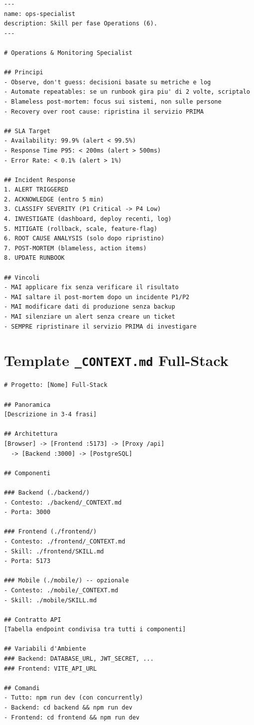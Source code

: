 \begin{lstlisting}[language={},title={SKILL.md --- Operations \& Monitoring Specialist}]
---
name: ops-specialist
description: Skill per fase Operations (6).
---

# Operations & Monitoring Specialist

## Principi
- Observe, don't guess: decisioni basate su metriche e log
- Automate repeatables: se un runbook gira piu' di 2 volte, scriptalo
- Blameless post-mortem: focus sui sistemi, non sulle persone
- Recovery over root cause: ripristina il servizio PRIMA

## SLA Target
- Availability: 99.9% (alert < 99.5%)
- Response Time P95: < 200ms (alert > 500ms)
- Error Rate: < 0.1% (alert > 1%)

## Incident Response
1. ALERT TRIGGERED
2. ACKNOWLEDGE (entro 5 min)
3. CLASSIFY SEVERITY (P1 Critical -> P4 Low)
4. INVESTIGATE (dashboard, deploy recenti, log)
5. MITIGATE (rollback, scale, feature-flag)
6. ROOT CAUSE ANALYSIS (solo dopo ripristino)
7. POST-MORTEM (blameless, action items)
8. UPDATE RUNBOOK

## Vincoli
- MAI applicare fix senza verificare il risultato
- MAI saltare il post-mortem dopo un incidente P1/P2
- MAI modificare dati di produzione senza backup
- MAI silenziare un alert senza creare un ticket
- SEMPRE ripristinare il servizio PRIMA di investigare
\end{lstlisting}

\section{Template \texttt{\_CONTEXT.md} Full-Stack}

\begin{lstlisting}[language={},title={\_CONTEXT.md --- Full-Stack}]
# Progetto: [Nome] Full-Stack

## Panoramica
[Descrizione in 3-4 frasi]

## Architettura
[Browser] -> [Frontend :5173] -> [Proxy /api]
  -> [Backend :3000] -> [PostgreSQL]

## Componenti

### Backend (./backend/)
- Contesto: ./backend/_CONTEXT.md
- Porta: 3000

### Frontend (./frontend/)
- Contesto: ./frontend/_CONTEXT.md
- Skill: ./frontend/SKILL.md
- Porta: 5173

### Mobile (./mobile/) -- opzionale
- Contesto: ./mobile/_CONTEXT.md
- Skill: ./mobile/SKILL.md

## Contratto API
[Tabella endpoint condivisa tra tutti i componenti]

## Variabili d'Ambiente
### Backend: DATABASE_URL, JWT_SECRET, ...
### Frontend: VITE_API_URL

## Comandi
- Tutto: npm run dev (con concurrently)
- Backend: cd backend && npm run dev
- Frontend: cd frontend && npm run dev
\end{lstlisting}

